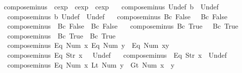\begin{isabellebody}
\isanewline
{}\isamarkupfalse%
\ compose{\isacharunderscore}minus\ {\isacharcolon}{\isacharcolon}\ {\isachardoublequoteopen}cexp\ {\isasymRightarrow}\ cexp\ {\isasymRightarrow}\ cexp{\isachardoublequoteclose}\ \isanewline
\ \ {\isachardoublequoteopen}compose{\isacharunderscore}minus\ Undef\ b\ {\isacharequal}\ Undef{\isachardoublequoteclose}\ {\isacharbar}\isanewline
\ \ {\isachardoublequoteopen}compose{\isacharunderscore}minus\ b\ Undef\ {\isacharequal}\ Undef{\isachardoublequoteclose}\ {\isacharbar}\isanewline
\ \ {\isachardoublequoteopen}compose{\isacharunderscore}minus\ {\isacharparenleft}Bc\ False{\isacharparenright}\ {\isacharunderscore}\ {\isacharequal}\ Bc\ False{\isachardoublequoteclose}\ {\isacharbar}\isanewline
\ \ {\isachardoublequoteopen}compose{\isacharunderscore}minus\ {\isacharunderscore}\ {\isacharparenleft}Bc\ False{\isacharparenright}\ {\isacharequal}\ Bc\ False{\isachardoublequoteclose}\ {\isacharbar}\isanewline
\ \ {\isachardoublequoteopen}compose{\isacharunderscore}minus\ {\isacharparenleft}Bc\ True{\isacharparenright}\ {\isacharunderscore}\ {\isacharequal}\ Bc\ True{\isachardoublequoteclose}\ {\isacharbar}\isanewline
\ \ {\isachardoublequoteopen}compose{\isacharunderscore}minus\ {\isacharunderscore}\ {\isacharparenleft}Bc\ True{\isacharparenright}\ {\isacharequal}\ Bc\ True{\isachardoublequoteclose}\ {\isacharbar}\isanewline
\ \ {\isachardoublequoteopen}compose{\isacharunderscore}minus\ {\isacharparenleft}Eq\ {\isacharparenleft}Num\ x{\isacharparenright}{\isacharparenright}\ {\isacharparenleft}Eq\ {\isacharparenleft}Num\ y{\isacharparenright}{\isacharparenright}\ {\isacharequal}\ Eq\ {\isacharparenleft}Num\ {\isacharparenleft}x{\isacharminus}y{\isacharparenright}{\isacharparenright}{\isachardoublequoteclose}\ {\isacharbar}\isanewline
\ \ {\isachardoublequoteopen}compose{\isacharunderscore}minus\ {\isacharparenleft}Eq\ {\isacharparenleft}Str\ x{\isacharparenright}{\isacharparenright}\ {\isacharunderscore}\ {\isacharequal}\ Undef{\isachardoublequoteclose}\ {\isacharbar}\isanewline
\ \ {\isachardoublequoteopen}compose{\isacharunderscore}minus\ {\isacharunderscore}\ {\isacharparenleft}Eq\ {\isacharparenleft}Str\ x{\isacharparenright}{\isacharparenright}\ {\isacharequal}\ Undef{\isachardoublequoteclose}\ {\isacharbar}\isanewline
\ \ {\isachardoublequoteopen}compose{\isacharunderscore}minus\ {\isacharparenleft}Eq\ {\isacharparenleft}Num\ x{\isacharparenright}{\isacharparenright}\ {\isacharparenleft}Lt\ {\isacharparenleft}Num\ y{\isacharparenright}{\isacharparenright}\ {\isacharequal}\ Gt\ {\isacharparenleft}Num\ {\isacharparenleft}x\ {\isacharminus}\ y{\isacharparenright}{\isacharparenright}{\isachardoublequoteclose}\ {\isacharbar}\isanewline

\end{isabellebody}

